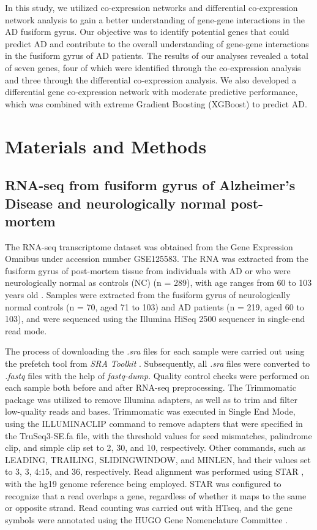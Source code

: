 \documentclass[utf8]{FrontiersinHarvard} %
\begin{document}
In this study, we utilized co-expression networks and differential co-expression network analysis to gain a better understanding of gene-gene interactions in the AD fusiform gyrus. Our objective was to identify potential genes that could predict AD and contribute to the overall understanding of gene-gene interactions in the fusiform gyrus of AD patients. The results of our analyses revealed a total of seven genes, four of which were identified through the co-expression analysis and three through the differential co-expression analysis. We also developed a differential gene co-expression network with moderate predictive performance, which was combined with extreme Gradient Boosting (XGBoost) to predict AD.

\section{Materials and Methods}

\subsection{RNA-seq from fusiform gyrus of Alzheimer's Disease and neurologically normal post-mortem}

The RNA-seq transcriptome dataset was obtained from the Gene Expression Omnibus under accession number GSE125583. The RNA was extracted from the fusiform gyrus of post-mortem tissue from individuals with AD or who were neurologically normal as controls (NC) (n = 289), with age ranges from 60 to 103 years old \citep{srinivasan2020alzheimer}. Samples were extracted from the fusiform gyrus of neurologically normal controls (n = 70, aged 71 to 103) and AD patients (n = 219, aged 60 to 103), and were sequenced using the Illumina HiSeq 2500 sequencer in single-end read mode.

The process of downloading the \textit{.sra} files for each sample were carried out using the prefetch tool from \textit{SRA Toolkit} \citep{leinonen2010sequence}. Subsequently, all \textit{.sra} files were converted to \textit{.fastq} files with the help of \textit{fastq-dump}. Quality control checks were performed on each sample both before and after RNA-seq preprocessing. The Trimmomatic package was utilized to remove Illumina adapters, as well as to trim and filter low-quality reads and bases. Trimmomatic was executed in Single End Mode, using the ILLUMINACLIP command to remove adapters that were specified in the TruSeq3-SE.fa file, with the threshold values for seed mismatches, palindrome clip, and simple clip set to 2, 30, and 10, respectively. Other commands, such as LEADING, TRAILING, SLIDINGWINDOW, and MINLEN, had their values set to 3, 3, 4:15, and 36, respectively. Read alignment was performed using STAR \citep{dobin2013star}, with the hg19 genome reference being employed. STAR was configured to recognize that a read overlaps a gene, regardless of whether it maps to the same or opposite strand. Read counting was carried out with HTseq, and the gene symbols were annotated using the HUGO Gene Nomenclature Committee \citep{anders2015htseq}.
\end{document}
